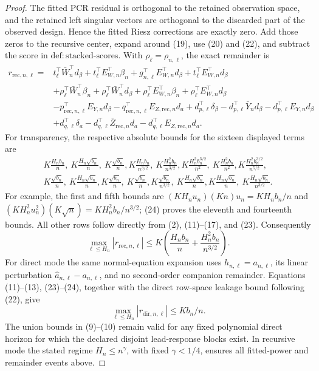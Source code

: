 \documentclass{article}
\begin{document}
\begin{proof}
The fitted PCR residual is orthogonal to the retained observation space, and the retained left singular vectors are orthogonal to the discarded part of the observed design.  Hence the fitted Riesz corrections are exactly zero.  Add those zeros to the recursive center, expand around (19), use (20) and (22), and subtract the score in \(\mathrm{def{:}stacked\mbox{-}scores}\).  With \(\rho_\ell=\rho_{n,\ell}\), the exact remainder is
\[
\begin{aligned}
 r_{\mathrm{rec},n,\ell}={}&
 t_\ell^\top\bar W_n^\top d_\beta+t_\ell^\top E_{W,n}^\top\beta_n
 +g_{n,\ell}^\top E_{W,n}^\top d_\beta+t_\ell^\top E_{W,n}^\top d_\beta\\
&+\rho_\ell^\top\bar W_n^\top\beta_n
 +\rho_\ell^\top\bar W_n^\top d_\beta
 +\rho_\ell^\top E_{W,n}^\top\beta_n
 +\rho_\ell^\top E_{W,n}^\top d_\beta\\
&-p_{\mathrm{rec},n,\ell}^\top E_{Y,n}d_\beta
 -q_{\mathrm{rec},n,\ell}^\top E_{Z,\mathrm{rec},n}d_a
 +d_{p,\ell}^\top\delta_\beta-d_{p,\ell}^\top\bar Y_nd_\beta
 -d_{p,\ell}^\top E_{Y,n}d_\beta\\
&+d_{q,\ell}^\top\delta_a-d_{q,\ell}^\top\bar Z_{\mathrm{rec},n}d_a
 -d_{q,\ell}^\top E_{Z,\mathrm{rec},n}d_a .
\end{aligned}
 \tag{25}
\]
For transparency, the respective absolute bounds for the sixteen displayed terms are
\[
\begin{gathered}
 K\frac{H_nb_n}{n},\ K\frac{H_n\sqrt{b_n}}n,\ K\frac{\sqrt{b_n}}n,
 K\frac{H_nb_n}{n^{3/2}},\ K\frac{H_n^2b_n}{n^{3/2}},
 K\frac{H_n^2b_n^{3/2}}{n^2},\ K\frac{H_n^2b_n}{n^2},
 K\frac{H_n^2b_n^{3/2}}{n^{5/2}},\\
 K\frac{\sqrt{b_n}}n,\ K\frac{H_n\sqrt{b_n}}n,
 K\frac{\sqrt{b_n}}n,\ K\frac{\sqrt{b_n}}n,
 K\frac{\sqrt{b_n}}{n^{3/2}},\ K\frac{H_n\sqrt{b_n}}n,
 K\frac{H_n\sqrt{b_n}}n,\ K\frac{H_n\sqrt{b_n}}{n^{3/2}}.
\end{gathered}
 \tag{26}
\]
For example, the first and fifth bounds are
\((KH_nu_n)(Kn)u_n=KH_nb_n/n\) and
\((KH_n^2u_n^2)(K\sqrt n)=KH_n^2b_n/n^{3/2}\); (24) proves the eleventh and fourteenth bounds.  All other rows follow directly from (2), (11)--(17), and (23).  Consequently
\[
 \max_{\ell\le H_n}|r_{\mathrm{rec},n,\ell}|
 \le K\left(\frac{H_nb_n}{n}+\frac{H_n^2b_n}{n^{3/2}}\right).
 \tag{27}
\]
For direct mode the same normal-equation expansion uses
\(h_{n,\ell}=a_{n,\ell}\), its linear perturbation
\(\widehat a_{n,\ell}-a_{n,\ell}\), and no second-order companion remainder.  Equations (11)--(13), (23)--(24), together with the direct row-space leakage bound following (22), give
\[
 \max_{\ell\le H_n}|r_{\mathrm{dir},n,\ell}|\le Kb_n/n.
 \tag{28}
\]
The union bounds in (9)--(10) remain valid for any fixed polynomial direct horizon for which the declared disjoint lead-response blocks exist.  In recursive mode the stated regime \(H_n\le n^\gamma\), with fixed \(\gamma<1/4\), ensures all fitted-power and remainder events above.


\end{proof}
\end{document}
